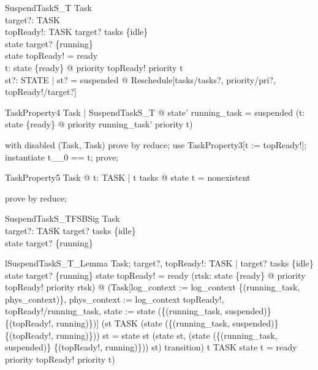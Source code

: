 \begin{schema}{SuspendTaskS\_T}
  \Delta Task\\
  target?: TASK\\
  topReady!: TASK
\where
  target? \in  tasks \setminus  \{idle\}\\
  state target? \in  \{running\}\\
  state topReady! = ready\\
  \forall  t: state \inv  \limg  \{ready\} \rimg  @ priority topReady! \geq  priority t\\
  \exists  st?: STATE | st? = suspended @ Reschedule[tasks/tasks?, priority/pri?, topReady!/target?]
\end{schema}

\begin{theorem}{TaskProperty4}
\forall  Task | SuspendTaskS\_T @ state' running\_task = suspended \land  (\forall  t: state \inv  \limg  \{ready\} \rimg  @ priority running\_task' \geq  priority t)
\end{theorem}

\begin{zproof}[TaskProperty4]
with disabled (\Delta Task, Task) prove by reduce;
use TaskProperty3[t := topReady!];
instantiate t\_\_0 == t;
prove;
\end{zproof}

\begin{theorem}{TaskProperty5}
\forall  Task @ \forall  t: TASK | t \notin  tasks @ state t = nonexistent
\end{theorem}

\begin{zproof}[TaskProperty5]
prove by reduce;
\end{zproof}

\begin{schema}{SuspendTaskS\_TFSBSig}
  Task\\
  target?: TASK
\where
  target? \in  tasks \setminus  \{idle\}\\
  state target? \in  \{running\}
\end{schema}

\begin{theorem}{lSuspendTaskS\_T\_Lemma}
\forall  Task; target?, topReady!: TASK | target? \in  tasks \setminus  \{idle\} \land  state target? \in  \{running\} \land  state topReady! = ready \land  (\forall  rtsk: state \inv  \limg  \{ready\} \rimg  @ priority topReady! \geq  priority rtsk) @ \lnot  (Task[log\_context := log\_context \oplus  \{(running\_task, phys\_context)\}, phys\_context := log\_context topReady!, topReady!/running\_task, state := state \oplus  (\{(running\_task, suspended)\} \cup  \{(topReady!, running)\})] \land  (st \in  TASK \land  \lnot  (state \oplus  (\{(running\_task, suspended)\} \cup  \{(topReady!, running)\})) st = state st \implies  (state st, (state \oplus  (\{(running\_task, suspended)\} \cup  \{(topReady!, running)\})) st) \in  transition) \implies  t \in  TASK \land  state t = ready \land  \lnot  priority topReady! \geq  priority t)
\end{theorem}

